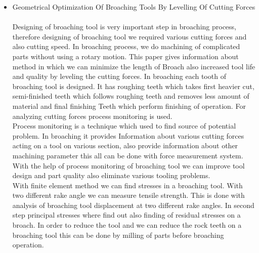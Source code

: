 \documentclass[16pt,a4paper]{article}
\begin{document}
\begin{itemize}
\item Geometrical Optimization Of Broaching Tools By Levelling Of Cutting Forces\\  
\\Designing of broaching tool is very important step in broaching process, therefore designing of broaching tool we required various cutting forces and also cutting speed. In broaching process, we do machining of complicated parts without using a rotary motion.
This paper gives information about method in which we can minimize the length of Broach also increased tool life and quality by leveling the cutting forces. In broaching each tooth of broaching tool is designed. It has roughing teeth which takes first heavier cut, semi-finished teeth which follows roughing teeth and removes less amount of material and final finishing Teeth which perform finishing of operation. For analyzing cutting forces process monitoring is used. 
\\Process monitoring is a technique which used to find source of potential problem. In broaching it provides Information about various cutting forces acting on a tool on various section, also provide information about other machining parameter this all can be done with force measurement system. With the help of process monitoring of broaching tool we can improve tool design and part quality also eliminate various tooling problems.
\\With finite element method we can find stresses in a broaching tool. With two different rake angle we can measure tensile strength. This is done with analysis of broaching tool displacement at two different rake angles. In second step principal stresses where find out also finding of residual stresses on a broach. In order to reduce the tool and we can reduce the rock teeth on a broaching tool this can be done by milling of parts before broaching operation.\\    


\end{itemize}
\end{document}
